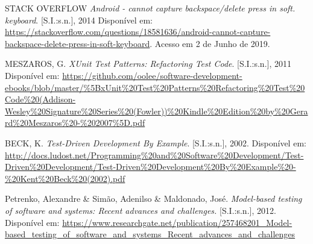 \documentclass[
    12pt,       %
    openright,      %
    twoside,      %
    a4paper,      %
    english,      %
    french,       %
    spanish,      %
    brazil,       %
    ]{abntex2}
\begin{document}
  \noindent
  STACK OVERFLOW \textit{Android - cannot capture backspace/delete press in soft. keyboard}. [S.I.:s.n.], 2014 Disponível em:
  \url{https://stackoverflow.com/questions/18581636/android-cannot-capture-backspace-delete-press-in-soft-keyboard}. Acesso em 2 de Junho de 2019.

  \noindent
  MESZAROS, G. \textit{XUnit Test Patterns: Refactoring Test Code}. [S.I.:s.n.], 2011 Disponível em:
  \url{https://github.com/oolee/software-development-ebooks/blob/master/%5BxUnit%20Test%20Patterns%20Refactoring%20Test%20Code%20(Addison-Wesley%20Signature%20Series%20(Fowler))%20Kindle%20Edition%20by%20Gerard%20Meszaros%20-%202007%5D.pdf}

  \noindent
  BECK, K. \textit{Test-Driven Development By Example}. [S.I.:s.n.], 2002. Disponível em:
  \url{http://docs.ludost.net/Programming%20and%20Software%20Development/Test-Driven%20Development/Test-Driven%20Development%20By%20Example%20-%20Kent%20Beck%20(2002).pdf}

  \noindent
  Petrenko, Alexandre & Simão, Adenilso & Maldonado, José. \textit{Model-based testing of software and systems: Recent advances and challenges.} [S.I.:s.n.], 2012. Disponível em:
  \url{https://www.researchgate.net/publication/257468201_Model-based_testing_of_software_and_systems_Recent_advances_and_challenges}








\end{document}
